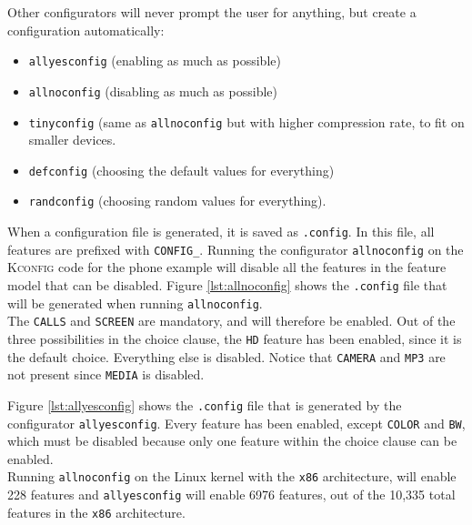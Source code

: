 \documentclass[a4paper,11pt]{report}
\newcommand{\figa}{
    \begin{figure}[!htpb]
    \centering
}
\newcommand{\figb}[2]{
    \caption{#1}
    \label{#2}
    \end{figure}
}
\begin{document}
Other configurators will 
never prompt the user for anything, but create a configuration automatically: 
\begin{itemize}
    \item \texttt{allyesconfig} (enabling as much as possible) 
    \item \texttt{allnoconfig} (disabling as much as possible)
    \item \texttt{tinyconfig} (same as \texttt{allnoconfig} but with higher 
    compression rate, to fit on smaller devices.
    \item \texttt{defconfig} (choosing the default values for everything)
    \item \texttt{randconfig} (choosing random values for everything).
\end{itemize}


When a configuration file is generated, it is saved as \texttt{.config}.
In this file, all features are prefixed with \texttt{CONFIG\_}.  
Running the configurator \texttt{allnoconfig} on the \textsc{Kconfig} code for 
the phone example will disable all the features 
in the feature model that can be disabled. Figure \ref{lst:allnoconfig} shows 
the \texttt{.config} file that will be generated when running 
\texttt{allnoconfig}.
\\

The \texttt{CALLS} and \texttt{SCREEN} are mandatory, and will 
therefore be enabled. Out of the three possibilities in the choice clause, the 
\texttt{HD} feature has been enabled, since it is the default choice. Everything
else is disabled. Notice that \texttt{CAMERA} and \texttt{MP3} are not present since \texttt{MEDIA} is disabled.


\figa
    \subfigure[allnoconfig]{
        \label{lst:allnoconfig}
        
    }
    \qquad %
    \subfigure[allyesconfig]{
        \label{lst:allyesconfig}
        
    }
\figb{}{}


Figure \ref{lst:allyesconfig} shows the \texttt{.config} file that is generated by 
the configurator \texttt{allyesconfig}.
Every feature has been enabled, except \texttt{COLOR} and \texttt{BW}, which 
must be disabled because only one feature within the choice clause can be enabled.
\\

Running \texttt{allnoconfig} on the Linux kernel with the \texttt{x86} architecture, will enable 228 features and 
\texttt{allyesconfig} will enable 6976 features, out of the 10,335 total features in the \texttt{x86} architecture.
\end{document}
